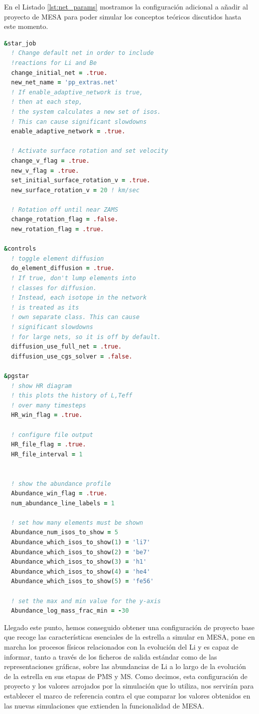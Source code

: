 En el Listado \ref{lst:net_params} mostramos la configuración adicional a añadir al proyecto de MESA para poder simular los conceptos teóricos discutidos hasta este momento.
\begin{lstlisting}[language=Fortran, caption={Parametrización de los procesos relacionados con el Li y de las gráficas de salida.}, label={lst:net_params}]
&star_job
  ! Change default net in order to include 
  !reactions for Li and Be
  change_initial_net = .true.
  new_net_name = 'pp_extras.net'
  ! If enable_adaptive_network is true, 
  ! then at each step, 
  ! the system calculates a new set of isos. 
  ! This can cause significant slowdowns
  enable_adaptive_network = .true.

  ! Activate surface rotation and set velocity
  change_v_flag = .true.
  new_v_flag = .true.
  set_initial_surface_rotation_v = .true.
  new_surface_rotation_v = 20 ! km/sec 

  ! Rotation off until near ZAMS
  change_rotation_flag = .false.
  new_rotation_flag = .true.

&controls
  ! toggle element diffusion
  do_element_diffusion = .true.
  ! If true, don't lump elements into 
  ! classes for diffusion. 
  ! Instead, each isotope in the network 
  ! is treated as its 
  ! own separate class. This can cause 
  ! significant slowdowns 
  ! for large nets, so it is off by default.
  diffusion_use_full_net = .true.
  diffusion_use_cgs_solver = .false.

&pgstar
  ! show HR diagram
  ! this plots the history of L,Teff 
  ! over many timesteps
  HR_win_flag = .true.

  ! configure file output 
  HR_file_flag = .true.
  HR_file_interval = 1


  ! show the abundance profile
  Abundance_win_flag = .true.
  num_abundance_line_labels = 1

  ! set how many elements must be shown
  Abundance_num_isos_to_show = 5
  Abundance_which_isos_to_show(1) = 'li7'
  Abundance_which_isos_to_show(2) = 'be7'
  Abundance_which_isos_to_show(3) = 'h1'
  Abundance_which_isos_to_show(4) = 'he4'
  Abundance_which_isos_to_show(5) = 'fe56'

  ! set the max and min value for the y-axis
  Abundance_log_mass_frac_min = -30
\end{lstlisting}

Llegado este punto, hemos conseguido obtener una configuración de proyecto base que recoge las características esenciales de la estrella a simular en MESA, pone en marcha los procesos físicos relacionados con la evolución del Li y es capaz de informar, tanto a través de los ficheros de salida estándar como de las representaciones gráficas, sobre las abundancias de Li a lo largo de la evolución de la estrella en sus etapas de PMS y MS. Como decimos, esta configuración de proyecto y los valores arrojados por la simulación que lo utiliza, nos servirán para establecer el marco de referencia contra el que comparar los valores obtenidos en las nuevas simulaciones que extienden la funcionalidad de MESA.\par

